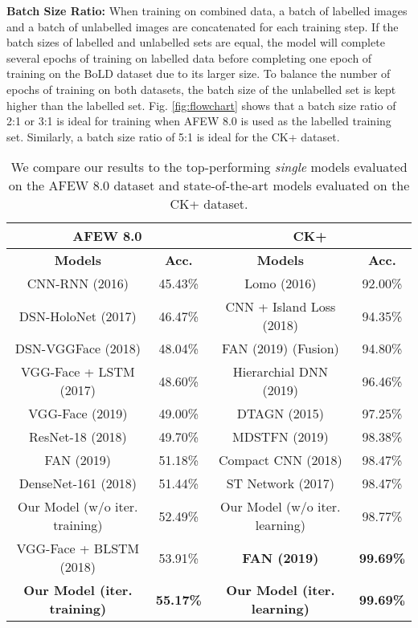 \documentclass[runningheads]{llncs}
\begin{document}
\noindent\textbf{{Batch Size Ratio:}}
When training on combined data, a batch of labelled images and a batch of unlabelled images are concatenated for each training step. If the batch sizes of labelled and unlabelled sets are equal, the model will complete several epochs of training on labelled data before completing one epoch of training on the BoLD dataset due to its larger size. To balance the number of epochs of training on both datasets, the batch size of the unlabelled set is kept higher than the labelled set. Fig. \ref{fig:flowchart} shows that a batch size ratio of 2:1 or 3:1 is ideal for training when AFEW 8.0 is used as the labelled training set. Similarly, a batch size ratio of 5:1 is ideal for the CK+ dataset. 



\setlength{\tabcolsep}{4pt}
\begin{table}[t!] 
\begin{center}
\caption{We compare our results to the top-performing {\it single} models evaluated on the AFEW 8.0 dataset and state-of-the-art models evaluated on the CK+ dataset.}\label{tab: compare}

\begin{tabular}{cc|cc}
\toprule
\multicolumn{2}{c}{AFEW 8.0} & \multicolumn{2}{|c}{CK+} \\
\hline
\textbf{Models}& \textbf{Acc.} & \textbf{Models}& \textbf{Acc.}  \\
\hline
CNN-RNN (2016) \cite{fan2016video}& 45.43\%  & Lomo (2016) \cite{sikka2016lomo} & 92.00\%\\
DSN-HoloNet (2017) \cite{hu2017learning}& 46.47\%& CNN + Island Loss (2018) \cite{cai2018island}& 94.35\%\\
DSN-VGGFace (2018) \cite{fan2018video} & 48.04\% & 
FAN (2019) (Fusion) \cite{meng2019frame} & 94.80\%\\
VGG-Face + LSTM (2017) \cite{vielzeuf2017temporal}& 48.60\% & Hierarchial DNN (2019) \cite{kim2019efficient} & 96.46\%\\
VGG-Face (2019) \cite{aminbeidokhti2019emotion} & 49.00\% & DTAGN (2015) \cite{jung2015joint} & 97.25\%\\
ResNet-18 (2018) \cite{vielzeuf2018occam} & 49.70\% & MDSTFN (2019) \cite{sun2019deep} & 98.38\%\\
FAN (2019) \cite{meng2019frame} & 51.18\% & Compact CNN (2018) \cite{kuo2018compact} & 98.47\%\\
DenseNet-161 (2018) \cite{liu2018multi} & 51.44\% & ST Network (2017) \cite{zhang2017facial} & 98.47\%\\
Our Model (w/o iter. training) & 52.49\% & Our Model (w/o iter. learning) & 98.77\%\\
VGG-Face + BLSTM (2018) \cite{lu2018multiple} & 53.91\% & \textbf{FAN (2019) \cite{meng2019frame}} & \textbf{99.69\%}\\
\textbf{Our Model (iter. training)} & \textbf{55.17\%} & \textbf{Our Model (iter. learning)} & \textbf{99.69\%}\\
 

\bottomrule
\end{tabular}
\end{center}
\end{table}
\setlength{\tabcolsep}{1.4pt}
\end{document}
